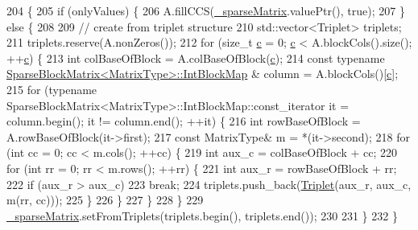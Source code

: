 \begin{DoxyCode}
204     \{
205       \textcolor{keywordflow}{if} (onlyValues) \{
206         A.fillCCS(\hyperlink{classg2o_1_1LinearSolverEigen_a39682995a9cf32dc79848281c6d4d9b9}{\_sparseMatrix}.valuePtr(), \textcolor{keyword}{true});
207       \} \textcolor{keywordflow}{else} \{
208 
209         \textcolor{comment}{// create from triplet structure}
210         std::vector<Triplet> triplets;
211         triplets.reserve(A.nonZeros());
212         \textcolor{keywordflow}{for} (\textcolor{keywordtype}{size\_t} \hyperlink{sparse__block__matrix_8hpp_a4e1e0e72dd773439e333c84dd762a9c3}{c} = 0; \hyperlink{sparse__block__matrix_8hpp_a4e1e0e72dd773439e333c84dd762a9c3}{c} < A.blockCols().size(); ++\hyperlink{sparse__block__matrix_8hpp_a4e1e0e72dd773439e333c84dd762a9c3}{c}) \{
213           \textcolor{keywordtype}{int} colBaseOfBlock = A.colBaseOfBlock(\hyperlink{sparse__block__matrix_8hpp_a4e1e0e72dd773439e333c84dd762a9c3}{c});
214           \textcolor{keyword}{const} \textcolor{keyword}{typename} \hyperlink{classg2o_1_1SparseBlockMatrix_aaa6ca1ae454ed70f62992b6401645f4e}{SparseBlockMatrix<MatrixType>::IntBlockMap}
      & column = A.blockCols()[\hyperlink{sparse__block__matrix_8hpp_a4e1e0e72dd773439e333c84dd762a9c3}{c}];
215           \textcolor{keywordflow}{for} (\textcolor{keyword}{typename} SparseBlockMatrix<MatrixType>::IntBlockMap::const\_iterator it = column.begin(); it 
      != column.end(); ++it) \{
216             \textcolor{keywordtype}{int} rowBaseOfBlock = A.rowBaseOfBlock(it->first);
217             \textcolor{keyword}{const} MatrixType& m = *(it->second);
218             \textcolor{keywordflow}{for} (\textcolor{keywordtype}{int} cc = 0; cc < m.cols(); ++cc) \{
219               \textcolor{keywordtype}{int} aux\_c = colBaseOfBlock + cc;
220               \textcolor{keywordflow}{for} (\textcolor{keywordtype}{int} rr = 0; rr < m.rows(); ++rr) \{
221                 \textcolor{keywordtype}{int} aux\_r = rowBaseOfBlock + rr;
222                 \textcolor{keywordflow}{if} (aux\_r > aux\_c)
223                   \textcolor{keywordflow}{break};
224                 triplets.push\_back(\hyperlink{classg2o_1_1LinearSolverEigen_a602c24e05d2f46022aa1827fdbc45638}{Triplet}(aux\_r, aux\_c, m(rr, cc)));
225               \}
226             \}
227           \}
228         \}
229         \hyperlink{classg2o_1_1LinearSolverEigen_a39682995a9cf32dc79848281c6d4d9b9}{\_sparseMatrix}.setFromTriplets(triplets.begin(), triplets.end());
230 
231       \}
232     \}
\end{DoxyCode}
